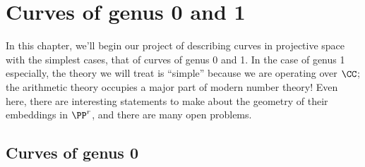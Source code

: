 

\chapter{Curves of genus 0 and 1}\label{genus 0 and 1 chapter}

In this chapter, we'll begin our project of describing curves in projective space with the simplest cases, that of curves of genus 0 and 1. In the case of genus 1 especially, the theory we will treat is ``simple'' because we are operating over $\CC$; the arithmetic theory occupies a major part of modern number theory! Even here, there are interesting statements to make about the geometry of their embeddings in $\PP^r$, and there are many open problems.


\section{Curves of genus 0} 


